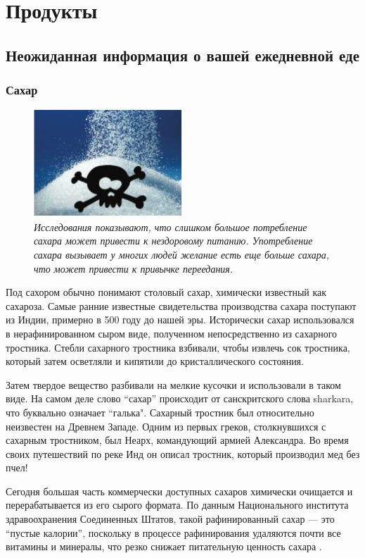 \chapter{Продукты}
\section{Неожиданная информация о вашей ежедневной еде}
\subsection{Сахар}
\begin{figure}
\includegraphics[width=0.5\textwidth]{img/sugar.png}
    \caption{\textit{Исследования показывают, что слишком большое потребление сахара может привести к нездоровому питанию. Употребление сахара вызывает у многих людей желание есть еще больше сахара, что может привести к привычке переедания.}}
\end{figure}
Под сахором обычно понимают столовый сахар, химически известный как сахароза. Самые ранние известные свидетельства производства сахара поступают из Индии, примерно в 500 году до нашей эры. Исторически сахар использовался в нерафинированном сыром виде, полученном непосредственно из сахарного тростника. Стебли сахарного тростника взбивали, чтобы извлечь сок тростника, который затем осветляли и кипятили до кристаллического состояния.

Затем твердое вещество разбивали на мелкие кусочки и использовали в таком виде. На самом деле слово “сахар” происходит от санскритского слова sharkara, что буквально означает “галька". Сахарный тростник был относительно неизвестен на Древнем Западе. Одним из первых греков, столкнувшихся с сахарным тростником, был Неарх, командующий армией Александра. Во время своих путешествий по реке Инд он описал тростник, который производил мед без пчел!

Сегодня большая часть коммерчески доступных сахаров химически очищается и перерабатывается из его сырого формата. По данным Национального института здравоохранения Соединенных Штатов, такой рафинированный сахар --- это “пустые калории”, поскольку в процессе рафинирования удаляются почти все витамины и минералы, что резко снижает питательную ценность сахара \cite{Carbohydrates}.

